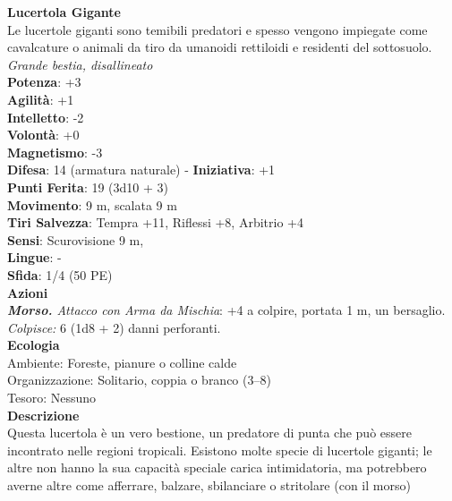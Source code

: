 \begin{multicols}{2}
\medskip\textbf{Lucertola Gigante}\\
Le lucertole giganti sono temibili predatori e spesso vengono impiegate come cavalcature o animali da tiro da umanoidi rettiloidi e residenti del sottosuolo.\\
\emph{Grande bestia, disallineato} \\
\textbf{Potenza}: +3\\
\textbf{Agilità}: +1\\
\textbf{Intelletto}: -2\\
\textbf{Volontà}: +0\\
\textbf{Magnetismo}: -3\\
\textbf{Difesa}: 14 (armatura naturale) - \textbf{Iniziativa}: +1\\
\textbf{Punti Ferita}: 19 (3d10 + 3)\\
\textbf{Movimento}: 9 m, scalata 9 m\\
\textbf{Tiri Salvezza}: Tempra +11, Riflessi +8, Arbitrio +4 \\
\textbf{Sensi}: Scurovisione 9 m, \\
\textbf{Lingue}: -\\
\textbf{Sfida}: 1/4 (50 PE)\smallskip\\
\smallskip\textbf{Azioni}\\
\emph{\textbf{Morso.} Attacco con Arma da Mischia}: +4 a colpire, portata 1 m, un bersaglio.\\
\emph{Colpisce:} 6 (1d8 + 2) danni perforanti.\\
\textbf{Ecologia}\\
Ambiente: Foreste, pianure o colline calde\\
Organizzazione: Solitario, coppia o branco (3–8)\\
Tesoro: Nessuno\\
\textbf{Descrizione}\\

Questa lucertola è un vero bestione, un predatore di punta che può essere incontrato nelle regioni tropicali. Esistono molte specie di lucertole giganti; le altre non hanno la sua capacità speciale carica intimidatoria, ma potrebbero averne altre come afferrare, balzare, sbilanciare o stritolare (con il morso)\\


\end{multicols}
